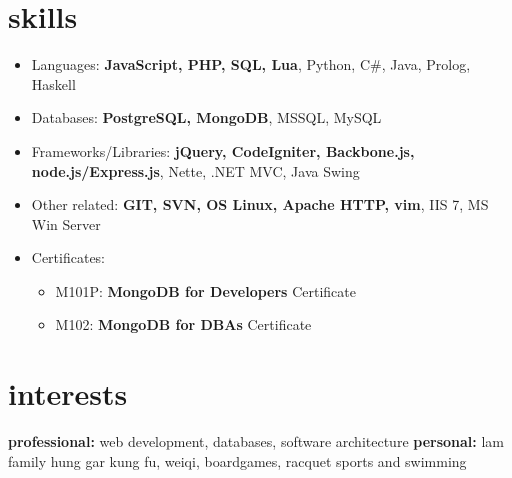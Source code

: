 \documentclass['print']{friggeri-cv} %
\begin{document}

\section{skills}
\begin{itemize}
\item
	Languages: \textbf{JavaScript, PHP, SQL, Lua}, Python, C\#, Java, Prolog, Haskell
\item
	Databases: \textbf{PostgreSQL, MongoDB}, MSSQL, MySQL
\item
	Frameworks/Libraries: \textbf{jQuery, CodeIgniter, Backbone.js, node.js/Express.js}, Nette, .NET MVC, Java Swing
\item
	Other related: \textbf{GIT, SVN, OS Linux, Apache HTTP, vim}, IIS 7, MS Win Server
\item
	Certificates:
	\begin{itemize}
		\item M101P: \textbf{MongoDB for Developers} Certificate
		\item M102: \textbf{MongoDB for DBAs} Certificate
	\end{itemize}
\end{itemize}


\section{interests}

\textbf{professional:} web development, databases, software architecture \textbf{personal:} lam family hung gar kung fu, weiqi, boardgames, racquet sports and swimming
\end{document}
